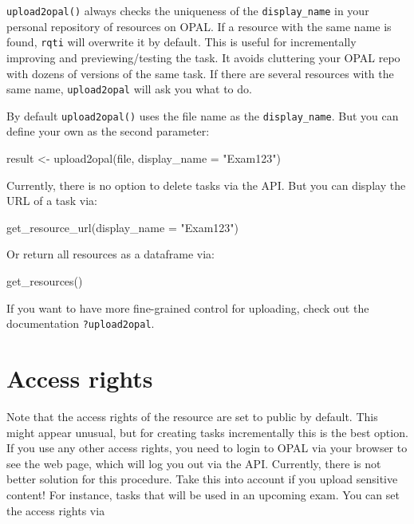 \documentclass[twoside]{tufte-book}
\newenvironment{Shaded}{}{}
\newcommand{\AttributeTok}[1]{\textcolor[rgb]{0.49,0.56,0.16}{#1}}
\newcommand{\FunctionTok}[1]{\textcolor[rgb]{0.02,0.16,0.49}{#1}}
\newcommand{\NormalTok}[1]{#1}
\newcommand{\OtherTok}[1]{\textcolor[rgb]{0.00,0.44,0.13}{#1}}
\newcommand{\StringTok}[1]{\textcolor[rgb]{0.25,0.44,0.63}{#1}}
\begin{document}
\texttt{upload2opal()} always checks the uniqueness of the \texttt{display\_name} in your personal repository of resources on OPAL. If a resource with the same name is found, \texttt{rqti} will overwrite it by default. This is useful for incrementally improving and previewing/testing the task. It avoids cluttering your OPAL repo with dozens of versions of the same task. If there are several resources with the same name, \texttt{upload2opal} will ask you what to do.

By default \texttt{upload2opal()} uses the file name as the \texttt{display\_name}. But you can define your own as the second parameter:

\begin{Shaded}
\begin{Highlighting}[]
\NormalTok{result }\OtherTok{\textless{}{-}} \FunctionTok{upload2opal}\NormalTok{(file, }\AttributeTok{display\_name =} \StringTok{"Exam123"}\NormalTok{)}
\end{Highlighting}
\end{Shaded}

Currently, there is no option to delete tasks via the API. But you can display the URL of a task via:

\begin{Shaded}
\begin{Highlighting}[]
\FunctionTok{get\_resource\_url}\NormalTok{(}\AttributeTok{display\_name =} \StringTok{"Exam123"}\NormalTok{)}
\end{Highlighting}
\end{Shaded}

Or return all resources as a dataframe via:

\begin{Shaded}
\begin{Highlighting}[]
\FunctionTok{get\_resources}\NormalTok{()}
\end{Highlighting}
\end{Shaded}

If you want to have more fine-grained control for uploading, check out the documentation \texttt{?upload2opal}.

\section{Access rights}\label{access-rights}

Note that the access rights of the resource are set to public by default. This might appear unusual, but for creating tasks incrementally this is the best option. If you use any other access rights, you need to login to OPAL via your browser to see the web page, which will log you out via the API. Currently, there is not better solution for this procedure. Take this into account if you upload sensitive content! For instance, tasks that will be used in an upcoming exam. You can set the access rights via
\end{document}
